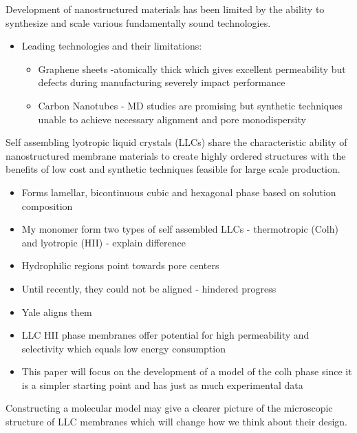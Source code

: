 \documentclass{article}
\begin{document}
	Development of nanostructured materials has been limited by the ability to synthesize and scale various fundamentally sound technologies.
	\begin{itemize}
		\item Leading technologies and their limitations:
		\begin{itemize}
			\item Graphene sheets -atomically thick which gives excellent permeability but defects during manufacturing severely impact performance
			\item Carbon Nanotubes - MD studies are promising but synthetic techniques unable to achieve necessary alignment and pore monodispersity
		\end{itemize}
	\end{itemize} 
	Self assembling lyotropic liquid crystals (LLCs) share the characteristic ability of nanostructured membrane materials to create highly ordered structures with the benefits of low cost and synthetic techniques feasible for large scale production.
	\begin{itemize}
		\item Forms lamellar, bicontinuous cubic and hexagonal phase based on solution composition
		\item My monomer form two types of self assembled LLCs - thermotropic (Colh) and lyotropic (HII) - explain difference 
		\item Hydrophilic regions point towards pore centers
		\item Until recently, they could not be aligned - hindered progress
		\item Yale aligns them
		\item LLC HII phase membranes offer potential for high permeability and selectivity which equals low energy consumption
		\item This paper will focus on the development of a model of the colh phase since it is a simpler starting point and has just as much experimental data
	\end{itemize}
	Constructing a molecular model may give a clearer picture of the microscopic structure of LLC membranes which will change how we think about their design.
\end{document}
